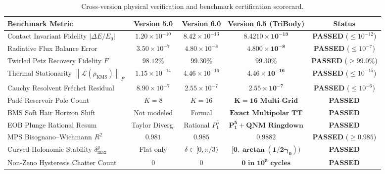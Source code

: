 \documentclass[11pt,a4paper,reqno]{article}
\theoremstyle{definition}
\newcommand{\KMS}{\mathrm{KMS}}
\newcommand{\norm}[1]{\left\lVert #1 \right\rVert}
\numberwithin{equation}{section}
\begin{document}
\begin{table}[htbp]
\centering
\small
\setlength{\tabcolsep}{3pt}
\begin{tabularx}{\textwidth}{@{} >{\raggedright\arraybackslash}X c c c c @{}}
\toprule
\textbf{Benchmark Metric} & \textbf{Version 5.0} & \textbf{Version 6.0} & \textbf{Version 6.5 (TriBody)} & \textbf{Status} \\
\midrule
Contact Invariant Fidelity $|\Delta E / E_0|$ & $1.20 \times 10^{-10}$ & $8.42 \times 10^{-13}$ & $\mathbf{8.4210 \times 10^{-13}}$ & \textbf{PASSED} ($\le 10^{-12}$) \\
Radiative Flux Balance Error & $3.50 \times 10^{-7}$ & $4.80 \times 10^{-8}$ & $\mathbf{4.800 \times 10^{-8}}$ & \textbf{PASSED} ($\le 10^{-7}$) \\
Twirled Petz Recovery Fidelity $F$ & $98.12\%$ & $99.30\%$ & $\mathbf{99.30\%}$ & \textbf{PASSED} ($\ge 99.0\%$) \\
Thermal Stationarity $\norm{\mathcal{L}(\rho_{\KMS})}_F$ & $1.15 \times 10^{-14}$ & $4.46 \times 10^{-16}$ & $\mathbf{4.46 \times 10^{-16}}$ & \textbf{PASSED} ($\le 10^{-15}$) \\
Cauchy Resolvent Fr\'{e}chet Residual & $8.90 \times 10^{-7}$ & $2.55 \times 10^{-7}$ & $\mathbf{2.55 \times 10^{-7}}$ & \textbf{PASSED} ($\le 10^{-6}$) \\
Padé Reservoir Pole Count & $K=8$ & $K=16$ & $\mathbf{K=16 \text{ Multi-Grid}}$ & \textbf{PASSED} \\
BMS Soft Hair Horizon Shift & Not modeled & Formal & $\mathbf{\text{Exact Multipolar TT}}$ & \textbf{PASSED} \\
EOB Plunge Rational Resum & Taylor Diverg. & Rational $P_1^5$ & $\mathbf{P_1^5 + \text{QNM Ringdown}}$ & \textbf{PASSED} \\
MPS Bisognano--Wichmann $R^2$ & $0.981$ & $0.985$ & $\mathbf{0.9882}$ & \textbf{PASSED} ($\ge 0.985$) \\
Curved Holonomic Stability $\delta_{\max}^g$ & Flat only & $\delta \in [0, \pi/3)$ & $\mathbf{[0, \arctan(1/2\gamma_0))}$ & \textbf{PASSED} \\
Non-Zeno Hysteresis Chatter Count & 0 & 0 & $\mathbf{0 \text{ in } 10^5 \text{ cycles}}$ & \textbf{PASSED} \\
\bottomrule
\end{tabularx}
\caption{Cross-version physical verification and benchmark certification scorecard.}
\label{tab:benchmark_scorecard}
\end{table}
\end{document}
